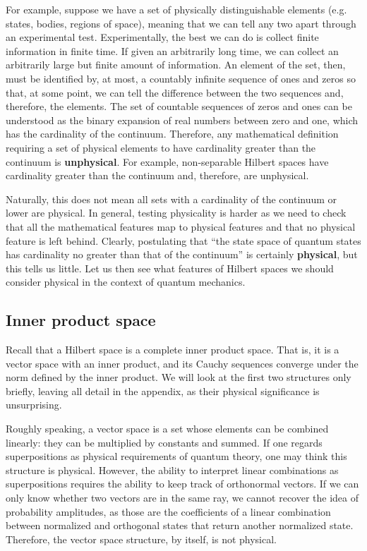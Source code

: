 \documentclass[10pt,twocolumn, nofootinbib]{revtex4-2}
\begin{document}
For example, suppose we have a set of physically distinguishable elements (e.g. states, bodies, regions of space), meaning that we can tell any two apart through an experimental test. Experimentally, the best we can do is collect finite information in finite time. If given an arbitrarily long time, we can collect an arbitrarily large but finite amount of information. An element of the set, then, must be identified by, at most, a countably infinite sequence of ones and zeros so that, at some point, we can tell the difference between the two sequences and, therefore, the elements. The set of countable sequences of zeros and ones can be understood as the binary expansion of real numbers between zero and one, which has the cardinality of the continuum. Therefore, any mathematical definition requiring a set of physical elements to have cardinality greater than the continuum is \textbf{unphysical}. For example, non-separable Hilbert spaces have cardinality greater than the continuum and, therefore, are unphysical.\cite{pittphilsci18363}

Naturally, this does not mean all sets with a cardinality of the continuum or lower are physical. In general, testing physicality is harder as we need to check that all the mathematical features map to physical features and that no physical feature is left behind. Clearly, postulating that ``the state space of quantum states has cardinality no greater than that of the continuum'' is certainly \textbf{physical}, but this tells us little. Let us then see what features of Hilbert spaces we should consider physical in the context of quantum mechanics.

\subsection{Inner product space}

Recall that a Hilbert space is a complete inner product space. That is, it is a vector space with an inner product, and its Cauchy sequences converge under the norm defined by the inner product. We will look at the first two structures only briefly, leaving all detail in the appendix, as their physical significance is unsurprising.

Roughly speaking, a vector space is a set whose elements can be combined linearly: they can be multiplied by constants and summed. If one regards superpositions as physical requirements of quantum theory, one may think this structure is physical. However, the ability to interpret linear combinations as superpositions requires the ability to keep track of orthonormal vectors. If we can only know whether two vectors are in the same ray, we cannot recover the idea of probability amplitudes, as those are the coefficients of a linear combination between normalized and orthogonal states that return another normalized state. Therefore, the vector space structure, by itself, is not physical.
\end{document}
